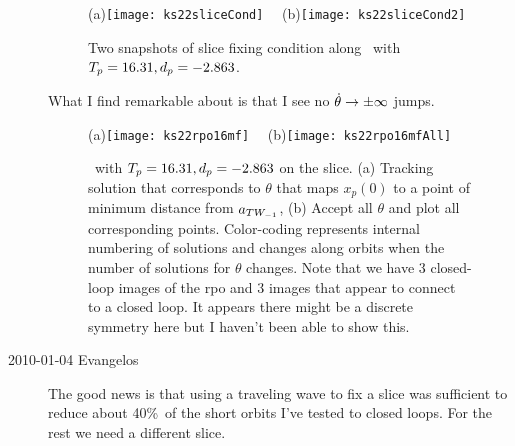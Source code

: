 \begin{description}
\begin{figure}
 (a)\texttt{[image: ks22sliceCond]}
 ~~(b)\texttt{[image: ks22sliceCond2]}
\caption{\label{ks22sliceCond}
Two snapshots of slice fixing condition  along \rpo\
with ${T_{p}}=16.31,d_p=-2.863$.
}
\end{figure}


What I find remarkable about  is that
I see no $ \dot{\theta} \to \pm\infty$ jumps.

\begin{figure}
 (a)\texttt{[image: ks22rpo16mf]}
 ~~(b)\texttt{[image: ks22rpo16mfAll]}
\caption{\label{ks22rpo16mf}
\Rpo\ with ${T_{p}}=16.31,d_p=-2.863$ on the  slice.
(a) Tracking solution that corresponds to $\theta$ that maps
$x_p(0)$ to a point of minimum distance from
$a_{TW_{-1}}$,
(b) Accept all $\theta$ and plot all corresponding points.
Color-coding represents internal numbering of solutions and
changes along orbits when the number of solutions for
$\theta$ changes. Note that we have $3$ closed-loop images of
the rpo and $3$ images that appear to connect to a closed
loop. It appears there might be a discrete symmetry here but
I haven't been able to show this.
}
\end{figure}


\item[2010-01-04 Evangelos]
The good news is that using a traveling wave to
fix a slice was sufficient to reduce about 40\%\ of the short orbits I've
tested to closed loops. For the rest we need a different slice.


\end{description}
